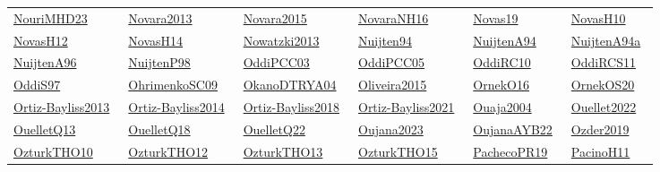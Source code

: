 \begin{longtable}{*{6}{l}}
\href{../}{NouriMHD23}~\cite{NouriMHD23} & \href{../}{Novara2013}~\cite{Novara2013} & \href{../}{Novara2015}~\cite{Novara2015} & \href{../works/NovaraNH16.pdf}{NovaraNH16}~\cite{NovaraNH16} & \href{../works/Novas19.pdf}{Novas19}~\cite{Novas19} & \href{../works/NovasH10.pdf}{NovasH10}~\cite{NovasH10}\\ 
\href{../works/NovasH12.pdf}{NovasH12}~\cite{NovasH12} & \href{../works/NovasH14.pdf}{NovasH14}~\cite{NovasH14} & \href{../}{Nowatzki2013}~\cite{Nowatzki2013} & \href{../works/Nuijten94.pdf}{Nuijten94}~\cite{Nuijten94} & \href{../works/NuijtenA94.pdf}{NuijtenA94}~\cite{NuijtenA94} & \href{../}{NuijtenA94a}~\cite{NuijtenA94a}\\ 
\href{../works/NuijtenA96.pdf}{NuijtenA96}~\cite{NuijtenA96} & \href{../works/NuijtenP98.pdf}{NuijtenP98}~\cite{NuijtenP98} & \href{../works/OddiPCC03.pdf}{OddiPCC03}~\cite{OddiPCC03} & \href{../}{OddiPCC05}~\cite{OddiPCC05} & \href{../works/OddiRC10.pdf}{OddiRC10}~\cite{OddiRC10} & \href{../works/OddiRCS11.pdf}{OddiRCS11}~\cite{OddiRCS11}\\ 
\href{../works/OddiS97.pdf}{OddiS97}~\cite{OddiS97} & \href{../works/OhrimenkoSC09.pdf}{OhrimenkoSC09}~\cite{OhrimenkoSC09} & \href{../}{OkanoDTRYA04}~\cite{OkanoDTRYA04} & \href{../}{Oliveira2015}~\cite{Oliveira2015} & \href{../works/OrnekO16.pdf}{OrnekO16}~\cite{OrnekO16} & \href{../works/OrnekOS20.pdf}{OrnekOS20}~\cite{OrnekOS20}\\ 
\href{../}{Ortiz-Bayliss2013}~\cite{Ortiz-Bayliss2013} & \href{../}{Ortiz-Bayliss2014}~\cite{Ortiz-Bayliss2014} & \href{../}{Ortiz-Bayliss2018}~\cite{Ortiz-Bayliss2018} & \href{../}{Ortiz-Bayliss2021}~\cite{Ortiz-Bayliss2021} & \href{../}{Ouaja2004}~\cite{Ouaja2004} & \href{../}{Ouellet2022}~\cite{Ouellet2022}\\ 
\href{../works/OuelletQ13.pdf}{OuelletQ13}~\cite{OuelletQ13} & \href{../works/OuelletQ18.pdf}{OuelletQ18}~\cite{OuelletQ18} & \href{../works/OuelletQ22.pdf}{OuelletQ22}~\cite{OuelletQ22} & \href{../}{Oujana2023}~\cite{Oujana2023} & \href{../works/OujanaAYB22.pdf}{OujanaAYB22}~\cite{OujanaAYB22} & \href{../}{Ozder2019}~\cite{Ozder2019}\\ 
\href{../works/OzturkTHO10.pdf}{OzturkTHO10}~\cite{OzturkTHO10} & \href{../works/OzturkTHO12.pdf}{OzturkTHO12}~\cite{OzturkTHO12} & \href{../works/OzturkTHO13.pdf}{OzturkTHO13}~\cite{OzturkTHO13} & \href{../works/OzturkTHO15.pdf}{OzturkTHO15}~\cite{OzturkTHO15} & \href{../works/PachecoPR19.pdf}{PachecoPR19}~\cite{PachecoPR19} & \href{../works/PacinoH11.pdf}{PacinoH11}~\cite{PacinoH11}\\ 

\end{longtable}
